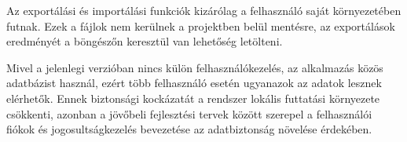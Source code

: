 \begin{description}
Az exportálási és importálási funkciók kizárólag a felhasználó saját környezetében futnak. Ezek a fájlok nem kerülnek a projektben belül mentésre, az exportálások eredményét a böngészőn keresztül van lehetőség letölteni.

Mivel a jelenlegi verzióban nincs külön felhasználókezelés, az alkalmazás közös adatbázist használ, ezért több felhasználó esetén ugyanazok az adatok lesznek elérhetők. Ennek biztonsági kockázatát a rendszer lokális futtatási környezete csökkenti, azonban a jövőbeli fejlesztési tervek között szerepel a felhasználói fiókok és jogosultságkezelés bevezetése az adatbiztonság növelése érdekében.

\end{description}